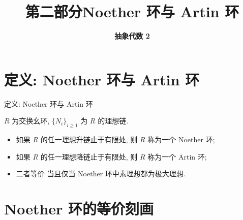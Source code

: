 \everymath{\displaystyle}



\title[第二部分\\
Noether 环与 Artin 环]{\texorpdfstring{\LARGE \bfseries 第二部分\quad Noether 环与 Artin 环}{第二部分 Noether 环与 Artin 环}}
\author[抽象代数 2]{\Large \bfseries 抽象代数 2}
\date{}





\begin{frame}

\titlepage %

\end{frame}


\section[定义]{定义: Noether 环与 Artin 环}


\begin{frame}{定义: Noether 环与 Artin 环}

\begin{Def}
$R$ 为交换幺环, $\{ N_i \}_{i \geqslant 1}$ 为 $R$ 的理想链.
\begin{itemize}
\item 如果 $R$ 的任一理想\alert{升链}止于有限处, 则 $R$ 称为一个 \alert{Noether 环};
\item 如果 $R$ 的任一理想\alert{降链}止于有限处, 则 $R$ 称为一个 \alert{Artin 环};
\item 二者等价 当且仅当 Noether 环中素理想都为极大理想.
\end{itemize}
\end{Def}

\end{frame}


\section[刻画]{Noether 环的等价刻画}

